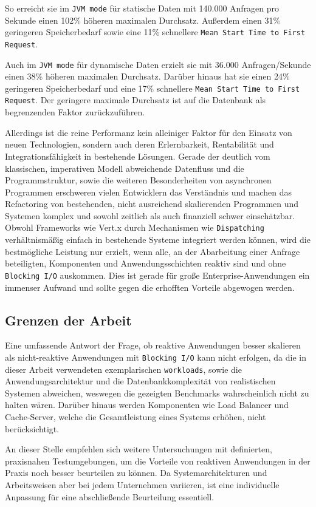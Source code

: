So erreicht sie im \verb|JVM mode| für statische Daten mit 140.000 Anfragen pro Sekunde einen 102\% höheren maximalen Durchsatz.
Außerdem einen 31\% geringeren Speicherbedarf sowie eine 11\% schnellere \verb|Mean Start Time to First Request|.

Auch im \verb|JVM mode| für dynamische Daten erzielt sie mit 36.000 Anfragen/Sekunde einen 38\% höheren maximalen Durchsatz.
Darüber hinaus hat sie einen 24\% geringeren Speicherbedarf und eine 17\% schnellere \verb|Mean Start Time to First Request|.\newline
Der geringere maximale Durchsatz ist auf die Datenbank als begrenzenden Faktor zurückzuführen.

Allerdings ist die reine Performanz kein alleiniger Faktor für den Einsatz von neuen Technologien, sondern auch deren
Erlernbarkeit, Rentabilität und Integrationsfähigkeit in bestehende Lösungen.
Gerade der deutlich vom klassischen, imperativen Modell abweichende Datenfluss und die Programmstruktur, sowie die weiteren Besonderheiten
von asynchronen Programmen erschweren vielen Entwicklern das Verständnis und machen das Refactoring von bestehenden, nicht ausreichend
skalierenden Programmen und Systemen komplex und sowohl zeitlich als auch finanziell schwer einschätzbar.
Obwohl Frameworks wie Vert.x durch Mechanismen wie \verb|Dispatching| verhältnismäßig einfach in bestehende Systeme integriert werden
können, wird die bestmögliche Leistung nur erzielt, wenn alle, an der Abarbeitung einer Anfrage beteiligten, Komponenten und
Anwendungsschichten reaktiv sind und ohne \verb|Blocking I/O| auskommen. Dies ist gerade für
große Enterprise-Anwendungen ein immenser Aufwand und sollte gegen die erhofften Vorteile abgewogen werden.


\subsection{Grenzen der Arbeit}
\label{subsec:grenzen_der_arbeit}
Eine umfassende Antwort der Frage, ob reaktive Anwendungen besser skalieren als nicht-reaktive Anwendungen
mit \verb|Blocking I/O| kann nicht erfolgen, da die in dieser Arbeit verwendeten exemplarischen \verb|workloads|, sowie
die Anwendungsarchitektur und die Datenbankkomplexität von realistischen Systemen abweichen, weswegen die gezeigten Benchmarks
wahrscheinlich nicht zu halten wären.
Darüber hinaus werden Komponenten wie Load Balancer und Cache-Server, welche die Gesamtleistung eines Systems erhöhen,
nicht berücksichtigt.

An dieser Stelle empfehlen sich weitere Untersuchungen mit definierten, praxisnahen Testumgebungen, um die Vorteile
von reaktiven Anwendungen in der Praxis noch besser beurteilen zu können.
Da Systemarchitekturen und Arbeitsweisen aber bei jedem Unternehmen variieren, ist eine individuelle Anpassung
für eine abschließende Beurteilung essentiell.

